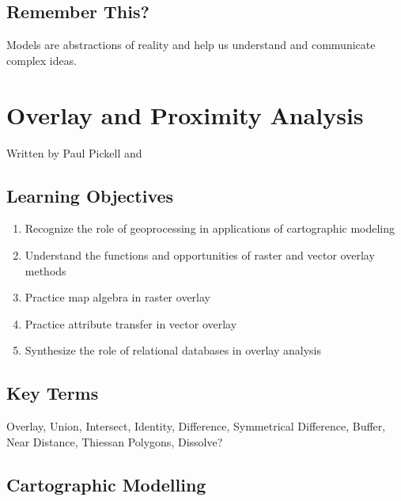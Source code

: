 \documentclass[
]{book}
\providecommand{\tightlist}{%
  \setlength{\itemsep}{0pt}\setlength{\parskip}{0pt}}
\begin{document}
\hypertarget{remember-this}{%
\section*{Remember This?}\label{remember-this}}

Models are abstractions of reality and help us understand and communicate complex ideas.

\hypertarget{overlay-and-proximity-analysis}{%
\chapter{Overlay and Proximity Analysis}\label{overlay-and-proximity-analysis}}

Written by
Paul Pickell and

\hypertarget{learning-objectives-5}{%
\section*{Learning Objectives}\label{learning-objectives-5}}

\begin{enumerate}
\def\labelenumi{\arabic{enumi}.}
\tightlist
\item
  Recognize the role of geoprocessing in applications of cartographic modeling
\item
  Understand the functions and opportunities of raster and vector overlay methods
\item
  Practice map algebra in raster overlay
\item
  Practice attribute transfer in vector overlay
\item
  Synthesize the role of relational databases in overlay analysis
\end{enumerate}

\hypertarget{key-terms-5}{%
\section*{Key Terms}\label{key-terms-5}}

Overlay, Union, Intersect, Identity, Difference, Symmetrical Difference, Buffer, Near Distance, Thiessan Polygons, Dissolve?

\hypertarget{cartographic-modelling}{%
\section{Cartographic Modelling}\label{cartographic-modelling}}
\end{document}
